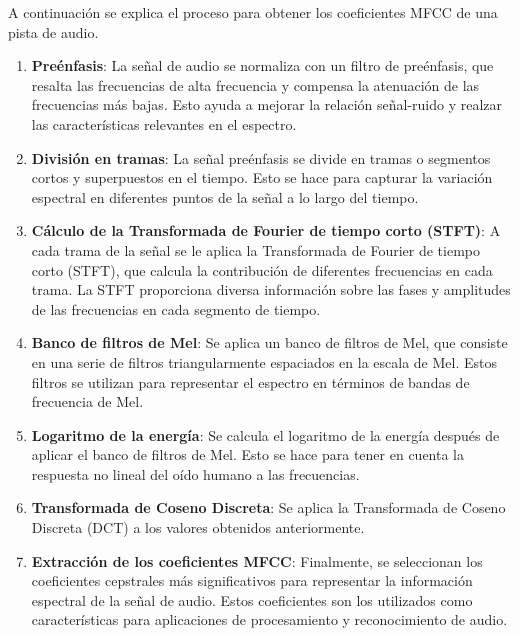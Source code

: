 A continuación se explica el proceso para obtener los coeficientes MFCC de una pista de audio.

\begin{enumerate}
\tightlist
\item \textbf{Preénfasis}: La señal de audio se normaliza con un filtro de preénfasis, que resalta las frecuencias de alta frecuencia y compensa la atenuación de las frecuencias más bajas. Esto ayuda a mejorar la relación señal-ruido y realzar las características relevantes en el espectro.

\item \textbf{División en tramas}: La señal preénfasis se divide en tramas o segmentos cortos y superpuestos en el tiempo. Esto se hace para capturar la variación espectral en diferentes puntos de la señal a lo largo del tiempo.

\item \textbf{Cálculo de la Transformada de Fourier de tiempo corto (STFT)}: A cada trama de la señal se le aplica la Transformada de Fourier de tiempo corto (STFT), que calcula la contribución de diferentes frecuencias en cada trama. La STFT proporciona diversa información sobre las fases y amplitudes de las frecuencias en cada segmento de tiempo.

\item \textbf{Banco de filtros de Mel}: Se aplica un banco de filtros de Mel, que consiste en una serie de filtros triangularmente espaciados en la escala de Mel. Estos filtros se utilizan para representar el espectro en términos de bandas de frecuencia de Mel.

\item \textbf{Logaritmo de la energía}: Se calcula el logaritmo de la energía después de aplicar el banco de filtros de Mel. Esto se hace para tener en cuenta la respuesta no lineal del oído humano a las frecuencias.

\item \textbf{Transformada de Coseno Discreta}: Se aplica la Transformada de Coseno Discreta (DCT) a los valores obtenidos anteriormente.

\item \textbf{Extracción de los coeficientes MFCC}: Finalmente, se seleccionan los coeficientes cepstrales más significativos para representar la información espectral de la señal de audio. Estos coeficientes son los utilizados como características para aplicaciones de procesamiento y reconocimiento de audio.
\end{enumerate}

